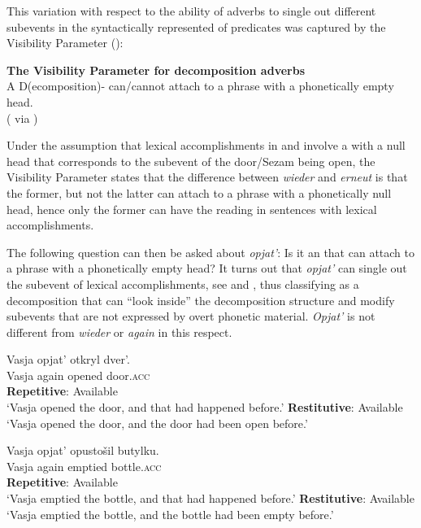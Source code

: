 \documentclass[output=paper]{langscibook}
\begin{document}
\noindent This variation with respect to the ability of adverbs to single out different subevents in the syntactically represented  of predicates was captured by the Visibility Parameter (\citealt{Rapp-vonStechow1999,Beck2005}):


 \ea\label{ex:bondarenko:15}
\textbf{The Visibility Parameter for decomposition adverbs}\\
A D(ecomposition)- can\slash cannot attach to a phrase with a phonetically empty head.\\
\hfill(\citealt{Rapp-vonStechow1999} via \citealt[13]{Beck2005})
\z

\noindent Under the assumption that lexical accomplishments in  and  involve a  with a null head that corresponds to the  subevent of the door\slash Sezam being open, the Visibility Parameter states that the difference between  \textit{wieder} and \textit{erneut} is that the former, but not the latter can attach to a phrase with a phonetically null head, hence only the former can have the  reading in sentences with lexical accomplishments.



The following question can then be asked about  \textit{opjat’}: Is it an  that can attach to a phrase with a phonetically empty head? It turns out that \textit{opjat’} can single out the  subevent of lexical accomplishments, see  and , thus classifying as a decomposition  that can “look inside” the decomposition structure and modify subevents that are not expressed by overt phonetic material. \textit{Opjat’} is not different from  \textit{wieder} or  \textit{again} in this respect.\largerpage[-1]


 \ea\label{ex:bondarenko:16}
\gll Vasja opjat’ otkryl dver’.\\
     Vasja again opened door.\textsc{acc}\\
\ea \textbf{Repetitive}: Available\\
`Vasja opened the door, and that had happened before.'
\ex \textbf{Restitutive}: Available\\
`Vasja opened the door, and the door had been open before.'
\z
\z

 \ea\label{ex:bondarenko:17}
\gll Vasja opjat’ opustošil butylku.\\
     Vasja again emptied bottle.\textsc{acc}\\
\ea \textbf{Repetitive}: Available\\
`Vasja emptied the bottle, and that had happened before.'
\ex \textbf{Restitutive}: Available\\
`Vasja emptied the bottle, and the bottle had been empty   before.'
\z
\z
\end{document}
